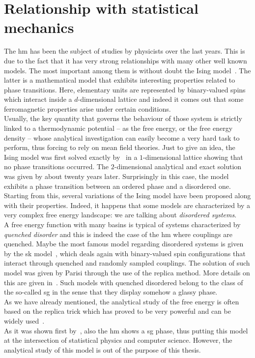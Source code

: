 \documentclass[\rootdir/main.tex]{subfiles}
\begin{document}
\section*{Relationship with statistical mechanics}
The \acrlong{hm} has been the subject of studies by physicists over the last years. This is due to the fact that it has very strong relationships with many other well known models. The most important among them is without doubt the Ising model~\cite{Ising}. The latter is a mathematical model that exhibits interesting properties related to phase transitions. Here, elementary units are represented by binary-valued spins which interact inside a $d$-dimensional lattice and indeed it comes out that some ferromagnetic properties arise under certain conditions.\\
Usually, the key quantity that governs the behaviour of those system is strictly linked to a thermodynamic potential -- as the free energy, or the free energy density -- whose analytical investigation can easily become a very hard task to perform, thus forcing to rely on mean field theories. Just to give an idea, the Ising model was first solved exactly by~\citeauthor{Ising} in a $1$-dimensional lattice showing that no phase transitions occurred. The $2$-dimensional analytical and exact solution was given by \textcite{Onsager} about twenty years later. Surprisingly in this case, the model exhibits a phase transition between an ordered phase and a disordered one.\\
Starting from this, several variations of the Ising model have been proposed along with their properties. Indeed, it happens that some models are characterized by a very complex free energy landscape: we are talking about \emph{disordered systems}.\\
A free energy function with many basins is typical of systems characterized by \emph{quenched disorder} and this is indeed the case of the \acrlong{hm} where couplings are quenched.
Maybe the most famous model regarding disordered systems is given by the \acrfull{sk} model~\cite{sk}, which deals again with binary-valued spin configurations that interact through quenched and randomly sampled couplings. The solution of such model was given by Parisi through the use of the replica method. More details on this are given in~\cite{parisi, nishimori}.
Such models with quenched disordered belong to the class of the so-called \acrlong{sg} in the sense that they display somehow a glassy phase.\\
As we have already mentioned, the analytical study of the free energy is often based on the replica trick which has proved to be very powerful and can be widely used~\cite{parisi_replica, montanari, Castellani}.\\
As it was shown first by~\cite{amit_phase}, also the \acrlong{hm} shows a \acrlong{sg} phase, thus putting this model at the intersection of statistical physics and computer science. However, the analytical study of this model is out of the purpose of this thesis.
    
\end{document}
